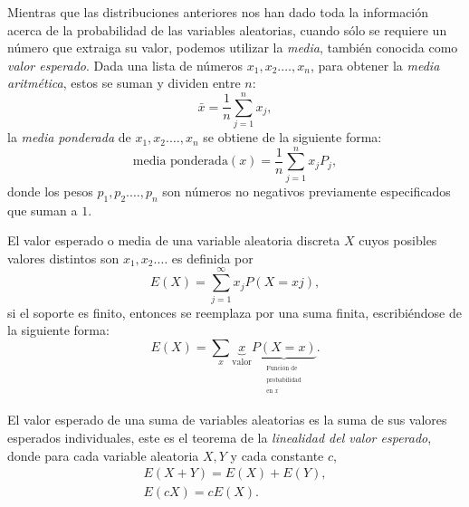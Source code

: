 Mientras que las distribuciones anteriores nos han dado toda la información acerca de la probabilidad de las variables aleatorias, cuando sólo se requiere un número que extraiga su valor, podemos utilizar la \emph{media}, también conocida como \emph{valor esperado}. Dada una lista de números $x_1,x_2.\ldots,x_n$, para obtener la \emph{media aritmética}, estos se suman y dividen entre $n$:
\begin{equation}
\bar{x}=\frac{1}{n}\sum_{j=1}^{n}x_j,
\end{equation}
la \emph{media ponderada} de $x_1,x_2.\ldots,x_n$ se obtiene de la siguiente forma:
\begin{equation}
\text{media ponderada}(x)=\frac{1}{n}\sum_{j=1}^{n}x_jP_j,
\end{equation}
donde los pesos $p_1,p_2.\ldots,p_n$ son números no negativos previamente especificados que suman a $1$.

El valor esperado o media de una variable aleatoria discreta $X$ cuyos posibles valores distintos son $x_1,x_2.\ldots $ es definida por
\begin{equation}
E(X)=\sum_{j=1}^{\infty}x_jP(X=xj),
\end{equation}
si el soporte es finito, entonces se reemplaza por una suma finita, escribiéndose de la siguiente forma:
\begin{equation}
E(X)=\sum_{x}\underbrace{x}_\text{valor}\underbrace{P(X=x)}_{\begin{matrix}^\text{Función de}\\^\text{probabilidad}\\^\text{en $x$}\end{matrix}}.
\end{equation}

El valor esperado de una suma de variables aleatorias es la suma de sus valores esperados individuales, este es el teorema de la \emph{linealidad del valor esperado}, donde para cada variable aleatoria $X,Y$ y cada constante $c$,
\begin{equation}
\begin{matrix}
E(X+Y)=E(X)+E(Y),\\
E(cX)=cE(X).
\end{matrix}
\end{equation}

